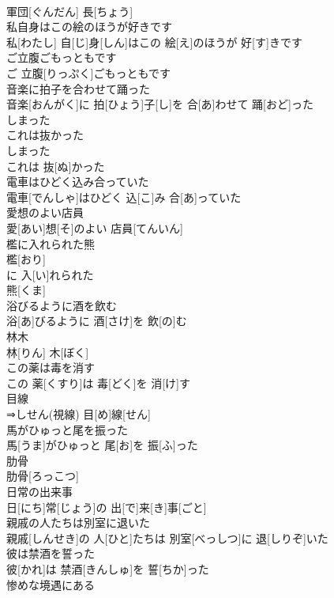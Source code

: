 \documentclass[8pt]{extreport}
\begin{document}
\begin{CJK}{UTF8}{min}
\\	軍団[ぐんだん] 長[ちょう]
\\	私自身はこの絵のほうが好きです	
\\	私[わたし] 自[じ]身[しん]はこの 絵[え]のほうが 好[す]きです
\\	ご立腹ごもっともです	
\\	ご 立腹[りっぷく]ごもっともです
\\	音楽に拍子を合わせて踊った	
\\	音楽[おんがく]に 拍[ひょう]子[し]を 合[あ]わせて 踊[おど]った
\\	しまった
\\	これは抜かった	
\\	しまった
\\	これは 抜[ぬ]かった
\\	電車はひどく込み合っていた	
\\	電車[でんしゃ]はひどく 込[こ]み 合[あ]っていた
\\	愛想のよい店員	
\\	愛[あい]想[そ]のよい 店員[てんいん]
\\	檻に入れられた熊	
\\	檻[おり]
\\	に 入[い]れられた 
\\	熊[くま]
\\	浴びるように酒を飲む	
\\	浴[あ]びるように 酒[さけ]を 飲[の]む
\\	林木	
\\	林[りん] 木[ぼく]
\\	この薬は毒を消す	
\\	この 薬[くすり]は 毒[どく]を 消[け]す
\\	目線	
\\	⇒しせん(視線)	目[め]線[せん]
\\	馬がひゅっと尾を振った	
\\	馬[うま]がひゅっと 尾[お]を 振[ふ]った
\\	肋骨	
\\	肋骨[ろっこつ]
\\	日常の出来事	
\\	日[にち]常[じょう]の 出[で]来[き]事[ごと]
\\	親戚の人たちは別室に退いた	
\\	親戚[しんせき]の 人[ひと]たちは 別室[べっしつ]に 退[しりぞ]いた
\\	彼は禁酒を誓った	
\\	彼[かれ]は 禁酒[きんしゅ]を 誓[ちか]った
\\	惨めな境遇にある	

\end{CJK}
\end{document}
